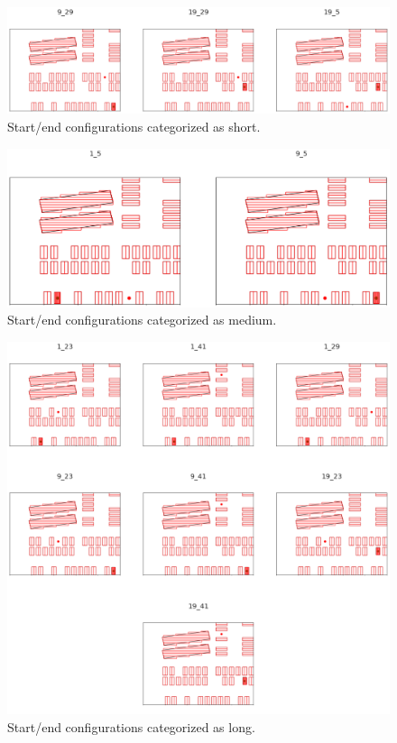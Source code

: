\documentclass[12pt]{article}
\DeclareRobustCommand{\[}{\begin{equation}}
\DeclareRobustCommand{\]}{\end{equation}}
\numberwithin{equation}{section}
\begin{document}
\begin{figure}[H]
\begin{center}
\includegraphics[scale=0.4]{images/shorts.png}
\captionsetup{width=0.6\textwidth}
\caption{Start/end configurations categorized as short.}
\end{center}
\end{figure}

\begin{figure}[H]
\begin{center}
\includegraphics[scale=0.4]{images/mediums.png}
\captionsetup{width=0.6\textwidth}
\caption{Start/end configurations categorized as medium.}
\end{center}
\end{figure}

\begin{figure}[H]
\begin{center}
\includegraphics[scale=0.4]{images/longs.png}
\captionsetup{width=0.6\textwidth}
\caption{Start/end configurations categorized as long.}
\end{center}
\end{figure}
\end{document}
